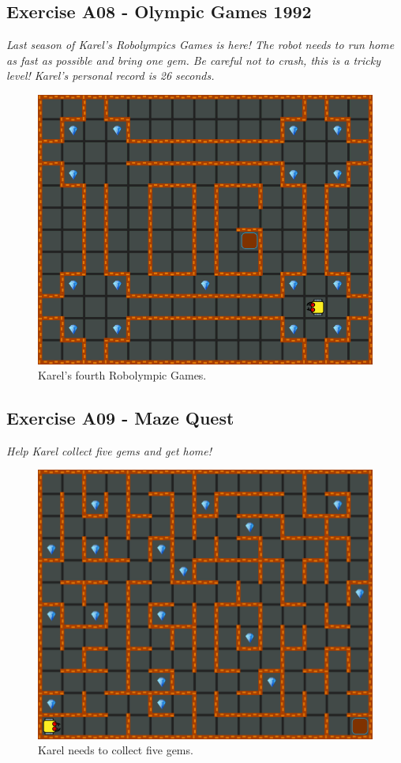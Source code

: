 \subsection{Exercise A08 - Olympic Games 1992}

{\em Last season of Karel's Robolympics Games is here! The 
robot needs to run home as fast as possible and bring one gem. 
Be careful not to crash, this is a tricky level! Karel's personal record is 26 seconds.}\\[-7mm]

\begin{figure}[!ht]
\begin{center}
\includegraphics[height=0.4\textwidth]{imgk/a08.png}
\end{center}
\vspace{-4mm}
\caption{Karel's fourth Robolympic Games.}
\label{fig:a08}
\vspace{-4mm}
\end{figure}
\noindent

\subsection{Exercise A09 - Maze Quest}

{\em​Help Karel collect five gems and get home!}\\[-7mm]

\begin{figure}[!ht]
\begin{center}
\includegraphics[height=0.4\textwidth]{imgk/a09.png}
\end{center}
\vspace{-4mm}
\caption{Karel needs to collect five gems.}
\label{fig:a09}
\vspace{-4mm}
\end{figure}
\noindent

